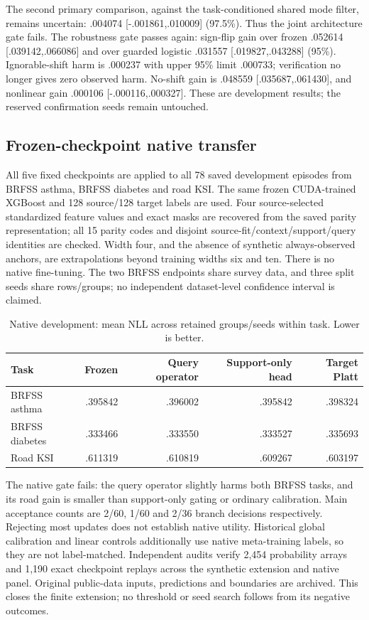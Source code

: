 \documentclass[10pt]{article}
\begin{document}
The second primary comparison, against the task-conditioned shared mode filter, remains uncertain: .004074 [-.001861,.010009] (97.5\%). Thus the joint architecture gate fails. The robustness gate passes again: sign-flip gain over frozen .052614 [.039142,.066086] and over guarded logistic .031557 [.019827,.043288] (95\%). Ignorable-shift harm is .000237 with upper 95\% limit .000733; verification no longer gives zero observed harm. No-shift gain is .048559 [.035687,.061430], and nonlinear gain .000106 [-.000116,.000327]. These are development results; the reserved confirmation seeds remain untouched.

\subsection{Frozen-checkpoint native transfer}
All five fixed checkpoints are applied to all 78 saved development episodes from BRFSS asthma, BRFSS diabetes and road KSI. The same frozen CUDA-trained XGBoost and 128 source/128 target labels are used. Four source-selected standardized feature values and exact masks are recovered from the saved parity representation; all 15 parity codes and disjoint source-fit/context/support/query identities are checked. Width four, and the absence of synthetic always-observed anchors, are extrapolations beyond training widths six and ten. There is no native fine-tuning. The two BRFSS endpoints share survey data, and three split seeds share rows/groups; no independent dataset-level confidence interval is claimed.
\begin{table}[t]
\centering\small
\caption{Native development: mean NLL across retained groups/seeds within task. Lower is better.}
\begin{tabular}{lrrrr}
\toprule
Task & Frozen & Query operator & Support-only head & Target Platt\\
\midrule
BRFSS asthma & .395842 & .396002 & .395842 & .398324\\
BRFSS diabetes & .333466 & .333550 & .333527 & .335693\\
Road KSI & .611319 & .610819 & .609267 & .603197\\
\bottomrule
\end{tabular}
\end{table}
The native gate fails: the query operator slightly harms both BRFSS tasks, and its road gain is smaller than support-only gating or ordinary calibration. Main acceptance counts are 2/60, 1/60 and 2/36 branch decisions respectively. Rejecting most updates does not establish native utility. Historical global calibration and linear controls additionally use native meta-training labels, so they are not label-matched. Independent audits verify 2,454 probability arrays and 1,190 exact checkpoint replays across the synthetic extension and native panel. Original public-data inputs, predictions and boundaries are archived. This closes the finite extension; no threshold or seed search follows from its negative outcomes.
\end{document}

